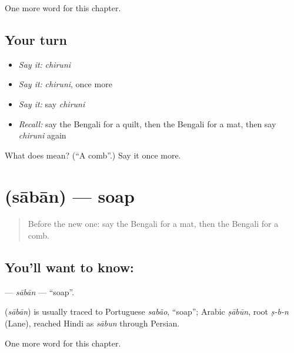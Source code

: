 \begin{grammarlens}[title={What you've built}]
One more word for this chapter.
\end{grammarlens}

\subsection*{Your turn}
\begin{itemize}
\raggedright
  \item \emph{Say it:} \emph{chiruni}
  \item \emph{Say it:} \emph{chiruni}, once more
  \item \emph{Say it:} say \emph{chiruni}
  \item \emph{Recall:} say the Bengali for a quilt, then the Bengali for a mat, then say \emph{chiruni} again
\end{itemize}

\begin{tcolorbox}[breakable,colback=teal!4,colframe=teal!35!black,title={Before you move on}]
What does  mean? (\textquotedblleft{}A comb\textquotedblright{}.) Say it once more.
\end{tcolorbox}
\section[\texorpdfstring{\bn{সাবান} (sābān)}{সাবান (sābān)}]{ (sābān) — soap}

\label{lesson:BN-C109-saban}



\begin{quote}
Before the new one: say the Bengali for a mat, then the Bengali for a comb.
\end{quote}

\subsection*{You'll want to know: }
\textbf{} — \emph{sābān} — \textquotedblleft{}soap\textquotedblright{}.

\begin{cousinweb}
\textbf{} (\emph{sābān}) is usually traced to Portuguese \emph{sabão}, \textquotedblleft{}soap\textquotedblright{}; Arabic \emph{ṣābūn}, root \emph{ṣ-b-n} (Lane), reached Hindi as \emph{sābun} through Persian.
\end{cousinweb}

\begin{grammarlens}[title={What you've built}]
One more word for this chapter.
\end{grammarlens}

